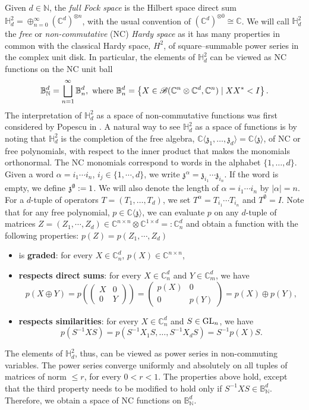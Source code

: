\documentclass{article}
\theoremstyle{definition}
\theoremstyle{remark}
\numberwithin{equation}{section}
\newcommand{\scr}{\ensuremath{\mathscr}}
\newcommand{\mf}{\ensuremath{\mathfrak}}
\def\C{\mathbb{C}}
\def\N{\mathbb{N}}
\def\B{\mathbb{B}}
\def\bH{\mathbb{H}}
\def\fp{\mathbb{C} \langle \mathbb{\mathfrak{z}} \rangle }
\def\hardy{\mathbb{H} ^2 _d}
\begin{document}
Given $d \in \N$, the \emph{full Fock space} is the Hilbert space direct sum $\bH^2_d = \oplus_{n=0}^{\infty} \left(\C^d\right)^{\otimes n}$, with the usual convention of $\left(\C^d\right)^{\otimes 0} \cong \C$. We will call $\hardy$ the \emph{free} or \emph{non-commutative} (NC) \emph{Hardy space} as it has many properties in common with the classical Hardy space, $H^2$, of square--summable power series in the complex unit disk. In particular, the elements of $\bH^2_d$ can be viewed as NC functions on the NC unit ball
\[
\B ^d _{\N} = \bigsqcup_{n=1}^{\infty} \B _n ^d, \text{ where } \B ^d _n  = \left\{ X \in \scr{B} (\C^n \otimes \C^d ,\C^n) \mid X X^* < I\right\}.
\]
The interpretation of $\hardy$ as a space of non-commutative functions was first considered by Popescu in \cite{Pop-freeholo}. A natural way to see $\bH^2_d$ as a space of functions is by noting that $\bH^2_d$ is the completion of the free algebra, $\C\langle \mathfrak{z}_1,\ldots,\mathfrak{z}_d \rangle = \fp$, of NC or free polynomials, with respect to the inner product that makes the monomials orthonormal. The NC monomials correspond to words in the alphabet $\{1,\ldots,d\}$. Given a word $\alpha = i_1 \cdots i_n$, $i_j \in \{ 1, \cdots , d \}$, we write $\mathfrak{z}^{\alpha} = \mathfrak{z}_{i_1} \cdots \mathfrak{z}_{ i_n}$. If the word is empty, we define $\mf{z} ^\emptyset := 1$. We will also denote the length of $\alpha = i_1 \cdots i_n$ by $|\alpha | =n$. For a $d$-tuple of operators $T = (T_1,\ldots,T_d)$, we set $T^{\alpha} = T_{i_1} \cdots T_{i_n}$ and $T^\emptyset =I$. Note that for any free polynomial, $p \in \fp$, we can evaluate $p$ on any $d$-tuple of matrices $Z = (Z_1, \cdots , Z_d ) \in \C ^{n\times n} \otimes \C ^{1\times d} =: \C ^d _n$ and obtain a function with the following properties: $p(Z) = p (Z_1, \cdots, Z_d)$  
\begin{itemize}
    \item[(i)] is \textbf{graded}: for every $X \in \C ^d _n$, $p(X) \in \C ^{n \times n}$,

    \item[(ii)] \textbf{respects direct sums}: for every $X \in \C ^d _n$ and $Y \in \C ^d _m$, we have $$p(X \oplus Y) = p\left( \begin{pmatrix} X & 0 \\ 0 & Y \end{pmatrix} \right) = \begin{pmatrix} p(X) & 0 \\ 0 & p(Y) \end{pmatrix} = p(X) \oplus p(Y),$$

    \item[(iii)] \textbf{respects similarities}: for every $X \in \C ^d _n $ and $S \in \mathrm{GL}_n$, we have $$p(S^{-1} X S) = p(S^{-1} X_1 S, \ldots, S^{-1} X_d S) = S^{-1} p(X) S.$$
\end{itemize}
The elements of $\bH^2_d$, thus, can be viewed as power series in non-commuting variables. The power series converge uniformly and absolutely on all tuples of matrices of norm $\leq r$, for every $0 < r < 1$. The properties above hold, except that the third property needs to be modified to hold only if $S^{-1} X S \in \B_\N ^d$. Therefore, we obtain a space of NC functions on $\B_\N ^d$.
\end{document}
